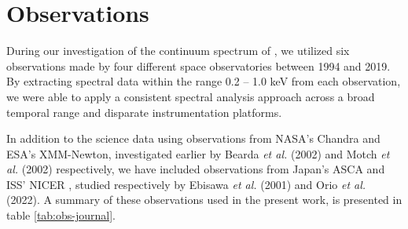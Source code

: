 \section{Observations}
	During our investigation of the continuum spectrum of \source, we utilized six observations made by four different space observatories between 1994 and 2019.
	By extracting spectral data within the range 0.2 -- 1.0 keV from each observation, we were able to apply a consistent spectral analysis approach across a broad temporal range and disparate instrumentation platforms.
		
	In addition to the science data using observations from NASA's Chandra and ESA's XMM-Newton, investigated earlier by Bearda \textit{et al.} (2002) and Motch \textit{et al.} (2002) respectively, we have included observations from Japan's ASCA \cite{ebisawaAsca2001ApJ} and ISS' NICER \cite{orioNicer2022ApJ}, studied respectively by Ebisawa \textit{et al.} (2001) and Orio \textit{et al.} (2022). A summary of these observations used in the present work, %
	is presented in table \ref{tab:obs-journal}. %
